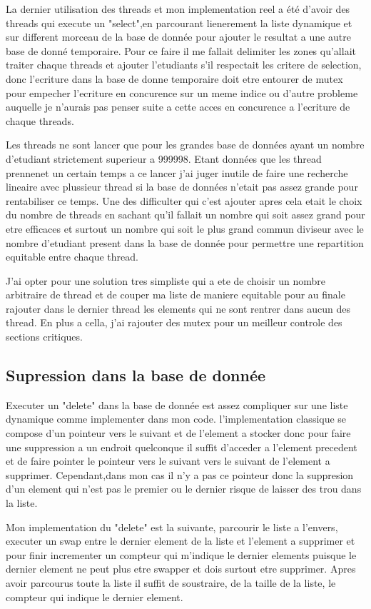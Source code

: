 \documentclass[a4paper, 12pt]{article}
\begin{document}
La dernier utilisation des threads et mon implementation reel a été d'avoir des threads qui execute un "select",en parcourant lienerement la liste dynamique et sur different morceau de la base de donnée pour ajouter le resultat a une autre base de donné temporaire. Pour ce faire il me fallait delimiter les zones qu'allait traiter 
chaque threads et ajouter l'etudiants s'il respectait les critere de selection, donc l'ecriture dans la base de donne temporaire doit etre entourer
de mutex pour empecher l'ecriture en concurence sur un meme indice ou d'autre probleme auquelle je n'aurais 
pas penser suite a cette acces en concurence a l'ecriture de chaque threads.

Les threads ne sont lancer que pour les grandes base de données ayant un nombre d'etudiant strictement superieur a 999998. Etant données que les thread prennenet un certain temps a ce lancer j'ai juger inutile de faire une recherche lineaire avec plussieur thread si la base de données n'etait pas assez grande pour rentabiliser ce temps. Une des difficulter qui c'est ajouter apres cela etait le choix
du nombre de threads en sachant qu'il fallait un nombre qui soit assez grand pour etre efficaces et surtout un nombre qui soit le plus grand commun diviseur avec le nombre 
d'etudiant present dans la base de donnée  pour permettre une repartition equitable entre chaque thread. 

J'ai opter pour une solution tres simpliste qui a ete de choisir un nombre arbitraire de thread et de couper ma liste de maniere equitable pour au finale rajouter dans le dernier thread les elements qui ne sont rentrer dans aucun  des thread. En plus a cella, j'ai rajouter des mutex pour un meilleur controle des sections critiques.


	\subsection{Supression dans la base de donnée}

Executer un "delete" dans la base de donnée est assez compliquer sur une liste dynamique comme implementer dans mon code. l'implementation classique se compose d'un pointeur vers le
suivant et de l'element a stocker donc pour faire une suppression a un endroit quelconque il suffit d'acceder a l'element precedent et de faire pointer le pointeur vers le suivant vers le suivant de l'element a supprimer. Cependant,dans mon cas il n'y a pas ce pointeur donc la suppresion d'un element qui n'est pas le premier ou le dernier risque de laisser des trou dans la liste.

Mon implementation du "delete" est la suivante, parcourir le liste a l'envers, executer un swap entre le dernier element de la liste et l'element a supprimer et pour finir incrementer un compteur qui m'indique le dernier elements puisque le dernier element ne peut plus etre swapper et dois surtout etre supprimer.
Apres avoir parcourus toute la liste il suffit de soustraire, de la taille de la liste, le compteur qui indique le dernier element.
\end{document}

